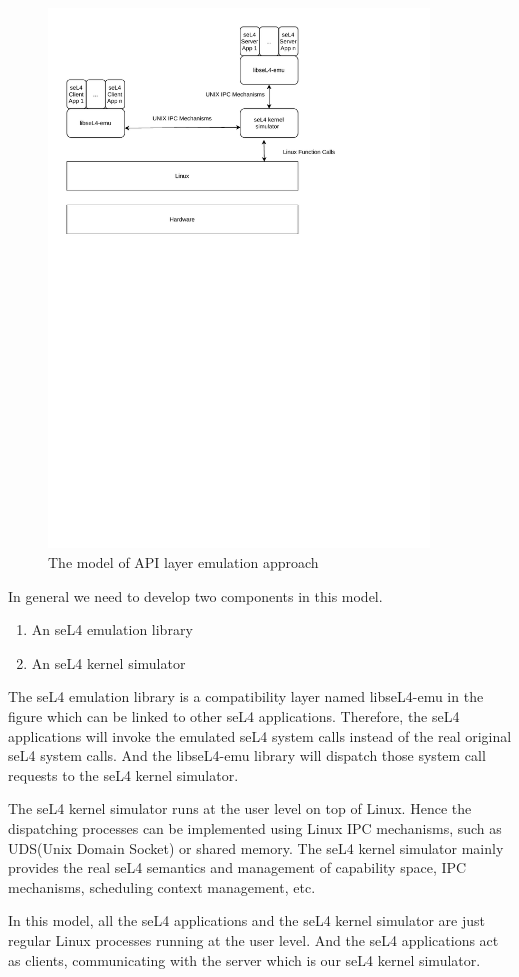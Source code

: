 \begin{figure}[h]
    \centering
    \includegraphics[clip, trim=0.5cm 16cm 3cm 0.5cm, width=0.9\textwidth, height=0.8\textwidth]{ch3/model1-v3.pdf}
    \caption{The model of API layer emulation approach}
    \label{fig:mapi}
\end{figure}

In general we need to develop two components in this model. 

\begin{enumerate}
\item An seL4 emulation library
\item An seL4 kernel simulator
\end{enumerate}

The seL4 emulation library is a compatibility layer named libseL4-emu in the figure which can be linked to other seL4 applications. Therefore, the seL4 applications will invoke the emulated seL4 system calls instead of the real original seL4 system calls. And the libseL4-emu library will dispatch those system call requests to the seL4 kernel simulator. 

The seL4 kernel simulator runs at the user level on top of Linux. Hence the dispatching processes can be implemented using Linux IPC mechanisms, such as UDS(Unix Domain Socket) or shared memory. The seL4 kernel simulator mainly provides the real seL4 semantics and management of capability space, IPC mechanisms, scheduling context management, etc. 

In this model, all the seL4 applications and the seL4 kernel simulator are just regular Linux processes running at the user level. And the seL4 applications act as clients, communicating with the server which is our seL4 kernel simulator. 


